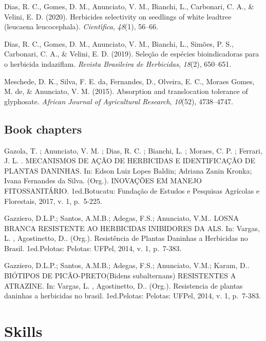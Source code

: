 \documentclass[11pt, a4paper]{awesome-cv}
\begin{document}
\leavevmode\hypertarget{ref-dias2020herbicides}{}%
Dias, R. C., Gomes, D. M., Anunciato, V. M., Bianchi, L., Carbonari, C.
A., \& Velini, E. D. (2020). Herbicides selectivity on seedlings of
white leadtree (leucaena leucocephala). \emph{Cient{ı́}fica},
\emph{48}(1), 56--66.

\leavevmode\hypertarget{ref-dias2019seleccao}{}%
Dias, R. C., Gomes, D. M., Anunciato, V. M., Bianchi, L., Simões, P. S.,
Carbonari, C. A., \& Velini, E. D. (2019). Sele{ç}{ã}o de esp{é}cies
bioindicadoras para o herbicida indaziflam. \emph{Revista Brasileira de
Herbicidas}, \emph{18}(2), 650--651.

\leavevmode\hypertarget{ref-meschede2015absorption}{}%
Meschede, D. K., Silva, F. E. da, Fernandes, D., Olveira, E. C., Moraes
Gomes, M. de, \& Anunciato, V. M. (2015). Absorption and translocation
tolerance of glyphosate. \emph{African Journal of Agricultural
Research}, \emph{10}(52), 4738--4747.

\endgroup

\hypertarget{book-chapters}{%
\subsection{Book chapters}\label{book-chapters}}

Gazola, T. ; Anunciato, V. M. ; Dias, R. C. ; Bianchi, L. ; Moraes, C.
P. ; Ferrari, J. L. . MECANISMOS DE AÇÃO DE HERBICIDAS E IDENTIFICAÇÃO
DE PLANTAS DANINHAS. In: Edson Luiz Lopes Baldin; Adriana Zanin Kronka;
Ivana Fernandes da Silva. (Org.). INOVAÇÕES EM MANEJO FITOSSANITÁRIO.
1ed.Botucatu: Fundação de Estudos e Pesquisas Agrícolas e Florestais,
2017, v. 1, p.~5-225.

Gazziero, D.L.P.; Santos, A.M.B.; Adegas, F.S.; Anunciato, V.M.. LOSNA
BRANCA RESISTENTE AO HERBICIDAS INIBIDORES DA ALS. In: Vargas, L. ,
Agostinetto, D.. (Org.). Resistência de Plantas Daninhas a Herbicidas no
Brasil. 1ed.Pelotas: Pelotas: UFPel, 2014, v. 1, p.~7-383.

Gazziero, D.L.P.; Santos, A.M.B.; Adegas, F.S.; Anunciato, V.M.; Karam,
D.. BIÓTIPOS DE PICÃO-PRETO(Bidens subalternans) RESISTENTES A ATRAZINE.
In: Vargas, L. , Agostinetto, D.. (Org.). Resistencia de plantas
daninhas a herbicidas no brasil. 1ed.Pelotas: Pelotas: UFPel, 2014, v.
1, p.~7-383.

\pagebreak

\hypertarget{skills}{%
\section{Skills}\label{skills}}
\end{document}
